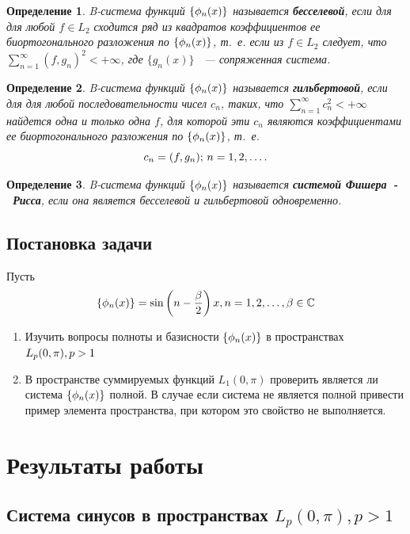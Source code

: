 ﻿\documentclass[oneside, final, 14pt]{extreport}
\newtheorem{definition}{Определение}
\begin{document}
\begin{definition}
	B-система функций $\{\phi_n(x)\}$ называется \textbf{бесселевой}, если для для любой $f \in L_2$ сходится ряд из квадратов
	коэффициентов ее биортогонального разложения по $\{\phi_n(x)\}$, т.~е. если из $f \in L_2$ следует, что \\
	$\sum\limits^\infty_{n = 1}(f, g_n)^2 < +\infty$, где $\{g_n(x)\}$ ~--- сопряженная система.
\end{definition}

\begin{definition}
	B-система функций $\{\phi_n(x)\}$ называется \textbf{гильбертовой}, если для для любой последовательности чисел
	$c_n$, таких, что $\sum\limits^\infty_{n = 1}c_n^2 < + \infty$ найдется одна и только одна $f$, для которой эти $c_n$
	являются коэффициентами ее биортогонального разложения по $\{\phi_n(x)\}$, т.~е.
	$$c_n = (f, g_n); \thinspace n = 1, 2, \ldots.$$
\end{definition}

\begin{definition}
	B-система функций $\{\phi_n(x)\}$ называется \textbf{системой Фишера~-~Рисса}, если она является бесселевой и гильбертовой 
	одновременно.
\end{definition}

\newpage	
\section{Постановка задачи}
Пусть $$\{\phi_n(x)\} = \sin\left(n - \frac{\beta}{2}\right)x, n = 1, 2, \dots,  \beta\in\mathbb{C}$$
\begin{enumerate}
	\item Изучить вопросы полноты и базисности $\{\phi_n(x)\}$ в пространствах $L_p(0, \pi),\\ p > 1$
	\item В пространстве суммируемых функций $L_1(0, \pi)$ проверить является ли система $\{\phi_n(x)\}$ полной.
	В случае если система не является полной привести пример элемента пространства, при котором это свойство не выполняется.
\end{enumerate}


\chapter*{Результаты работы}
\begin{raggedright}
\section{Система синусов в пространствах $L_p(0, \pi), p > 1$}
\end{raggedright}
\end{document}
